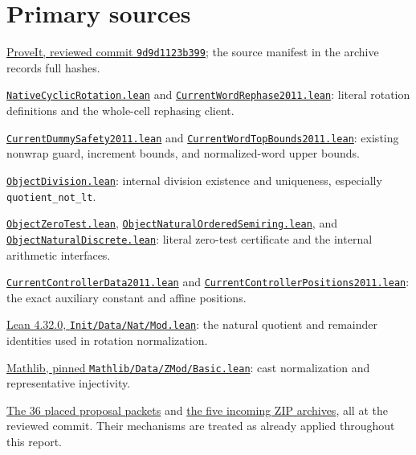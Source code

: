 \documentclass[11pt,letterpaper]{article}
\newcommand{\code}[1]{\nolinkurl{#1}}
\newcommand{\repo}{https://github.com/VladimirReshetnikov/ProveIt}
\newcommand{\pin}{9d9d1123b39927d30363f1dcd53c23f0575c30ee}
\newcommand{\src}[2]{\href{https://github.com/VladimirReshetnikov/ProveIt/blob/9d9d1123b39927d30363f1dcd53c23f0575c30ee/Computability/DiophantineConsistency/Lean/DiophantineConsistency/#1.lean}{\code{#2}}}
\begin{document}
\clearpage
\section*{Primary sources}
\begin{enumerate}[label={[\arabic*]},leftmargin=2em]
\item \href{\repo/commit/\pin}{ProveIt, reviewed commit \texttt{9d9d1123b399}}; the source manifest in the archive records full hashes.
\item \src{NativeCyclicRotation}{NativeCyclicRotation.lean} and \src{CurrentWordRephase2011}{CurrentWordRephase2011.lean}: literal rotation definitions and the whole-cell rephasing client.
\item \src{CurrentDummySafety2011}{CurrentDummySafety2011.lean} and \src{CurrentWordTopBounds2011}{CurrentWordTopBounds2011.lean}: existing nonwrap guard, increment bounds, and normalized-word upper bounds.
\item \src{ObjectDivision}{ObjectDivision.lean}: internal division existence and uniqueness, especially \code{quotient_not_lt}.
\item \src{ObjectZeroTest}{ObjectZeroTest.lean}, \src{ObjectNaturalOrderedSemiring}{ObjectNaturalOrderedSemiring.lean}, and \src{ObjectNaturalDiscrete}{ObjectNaturalDiscrete.lean}: literal zero-test certificate and the internal arithmetic interfaces.
\item \src{CurrentControllerData2011}{CurrentControllerData2011.lean} and \src{CurrentControllerPositions2011}{CurrentControllerPositions2011.lean}: the exact auxiliary constant and affine positions.
\item \href{https://github.com/leanprover/lean4/blob/v4.32.0/src/Init/Data/Nat/Mod.lean}{Lean 4.32.0, \code{Init/Data/Nat/Mod.lean}}: the natural quotient and remainder identities used in rotation normalization.
\item \href{https://github.com/leanprover-community/mathlib4/blob/81a5d257c8e410db227a6665ed08f64fea08e997/Mathlib/Data/ZMod/Basic.lean}{Mathlib, pinned \code{Mathlib/Data/ZMod/Basic.lean}}: cast normalization and representative injectivity.
\item \href{https://github.com/VladimirReshetnikov/ProveIt/tree/9d9d1123b39927d30363f1dcd53c23f0575c30ee/Computability/DiophantineConsistency/research/lean-proof-simplification}{The 36 placed proposal packets} and \href{https://github.com/VladimirReshetnikov/ProveIt/tree/9d9d1123b39927d30363f1dcd53c23f0575c30ee/docs/incoming}{the five incoming ZIP archives}, all at the reviewed commit. Their mechanisms are treated as already applied throughout this report.
\end{enumerate}
\end{document}

